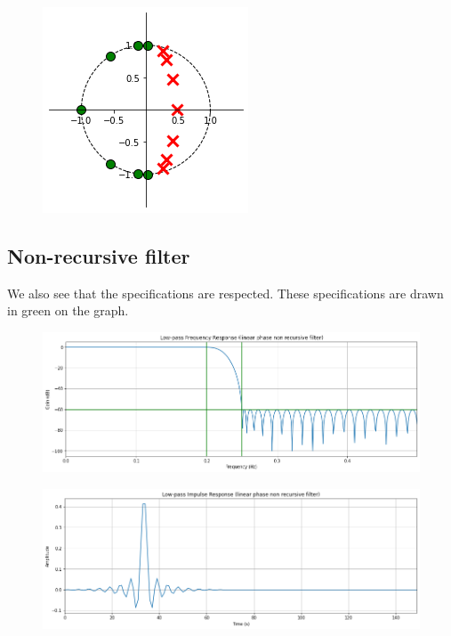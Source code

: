\documentclass[]{article}
\begin{document}
\begin{figure}[H]
    \centering
    \includegraphics[scale=0.7]{q23.png}
\end{figure}


\subsection*{Non-recursive filter}

We also see that the specifications are respected.
These specifications are drawn in green on the graph.

\begin{figure}[H]
    \centering
    \includegraphics[scale=0.5]{q24.png}
\end{figure}

\begin{figure}[H]
    \centering
    \includegraphics[scale=0.5]{q25.png}
\end{figure}
\end{document}
